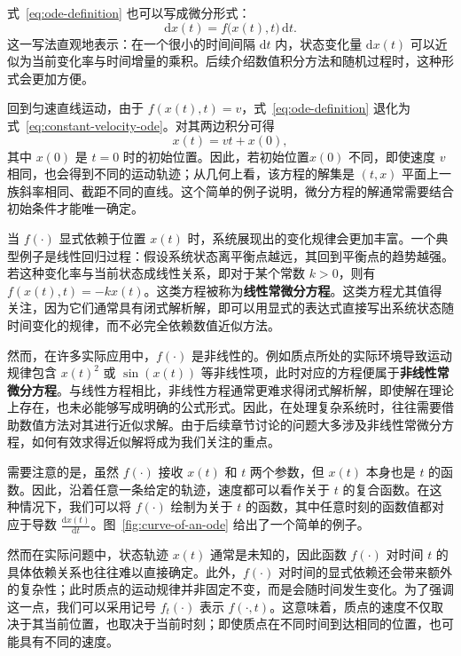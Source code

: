 \documentclass[UTF8,a4paper,zihao=-4,oneside,openany]{ctexbook}
\begin{document}
式~\eqref{eq:ode-definition} 也可以写成微分形式：
\begin{equation}
\mathrm{d}x(t)
=
f\bigl(x(t),t\bigr)\,\mathrm{d}t.
\label{eq:ode-differential-form}
\end{equation}
这一写法直观地表示：在一个很小的时间间隔 \(\mathrm{d}t\) 内，状态变化量 \(\mathrm{d}x(t)\) 可以近似为当前变化率与时间增量的乘积。后续介绍数值积分方法和随机过程时，这种形式会更加方便。

回到匀速直线运动，由于 \(f(x(t),t)=v\)，式~\eqref{eq:ode-definition} 退化为式~\eqref{eq:constant-velocity-ode}。对其两边积分可得
\begin{equation}
x(t)
=
vt+x(0),
\label{eq:uniform-linear-motion}
\end{equation}
其中 \(x(0)\) 是 \(t=0\) 时的初始位置。因此，若初始位置\(x(0)\) 不同，即使速度 \(v\) 相同，也会得到不同的运动轨迹；从几何上看，该方程的解集是 \((t,x)\) 平面上一族斜率相同、截距不同的直线。这个简单的例子说明，微分方程的解通常需要结合初始条件才能唯一确定。

当 \(f(\cdot)\) 显式依赖于位置 \(x(t)\) 时，系统展现出的变化规律会更加丰富。一个典型例子是线性回归过程：假设系统状态离平衡点越远，其回到平衡点的趋势越强。若这种变化率与当前状态成线性关系，即对于某个常数 \(k > 0\)，则有 \(f(x(t),t)=-kx(t)\)。这类方程被称为\textbf{线性常微分方程}。这类方程尤其值得关注，因为它们通常具有闭式解析解，即可以用显式的表达式直接写出系统状态随时间变化的规律，而不必完全依赖数值近似方法。 

然而，在许多实际应用中，\(f(\cdot)\) 是非线性的。例如质点所处的实际环境导致运动规律包含 \(x(t)^2\) 或 \(\sin(x(t))\) 等非线性项，此时对应的方程便属于\textbf{非线性常微分方程}。与线性方程相比，非线性方程通常更难求得闭式解析解，即使解在理论上存在，也未必能够写成明确的公式形式。因此，在处理复杂系统时，往往需要借助数值方法对其进行近似求解。由于后续章节讨论的问题大多涉及非线性常微分方程，如何有效求得近似解将成为我们关注的重点。 

需要注意的是，虽然 \(f(\cdot)\) 接收 \(x(t)\) 和 \(t\) 两个参数，但 \(x(t)\) 本身也是 \(t\) 的函数。因此，沿着任意一条给定的轨迹，速度都可以看作关于 \(t\) 的复合函数。在这种情况下，我们可以将 \(f(\cdot)\) 绘制为关于 \(t\) 的函数，其中任意时刻的函数值都对应于导数 \(\frac{\mathrm{d}x(t)}{\mathrm{d}t}\)。图~\ref{fig:curve-of-an-ode} 给出了一个简单的例子。

然而在实际问题中，状态轨迹 \(x(t)\) 通常是未知的，因此函数 \(f(\cdot)\) 对时间 \(t\) 的具体依赖关系也往往难以直接确定。此外，\(f(\cdot)\) 对时间的显式依赖还会带来额外的复杂性；此时质点的运动规律并非固定不变，而是会随时间发生变化。为了强调这一点，我们可以采用记号 \(f_t(\cdot)\) 表示 \(f(\cdot,t)\)。这意味着，质点的速度不仅取决于其当前位置，也取决于当前时刻；即使质点在不同时间到达相同的位置，也可能具有不同的速度。
\end{document}
